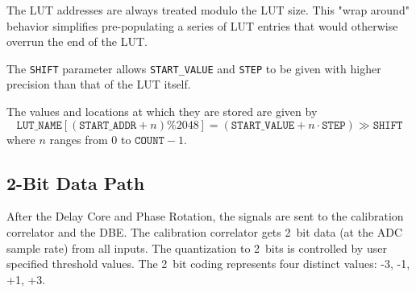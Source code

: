 \documentclass[12pt]{article}
\begin{document}
\begin{description}
The LUT addresses are always treated modulo the LUT size.  This "wrap around"
behavior simplifies pre-populating a series of LUT entries that would otherwise
overrun the end of the LUT.

The \verb|SHIFT| parameter allows \verb|START_VALUE| and \verb|STEP| to be
given with higher precision than that of the LUT itself.

The values and locations at which they are stored are given by
\begin{equation*}
\mathtt{LUT\_NAME}[(\mathtt{START\_ADDR} + n) \% 2048]
= (\mathtt{START\_VALUE} + n \cdot \mathtt{STEP}) \gg \mathtt{SHIFT} 
\end{equation*}
where $n$ ranges from 0 to $\mathtt{COUNT}-1$.

\end{description}

  \subsection{2-Bit Data Path}

After the Delay Core and Phase Rotation, the signals are sent to the
calibration correlator and the DBE.  The calibration correlator gets 2~bit data
(at the ADC sample rate) from all inputs.  The quantization to 2~bits is
controlled by user specified threshold values.  The 2~bit coding represents
four distinct values: -3, -1, +1, +3.
\end{document}
